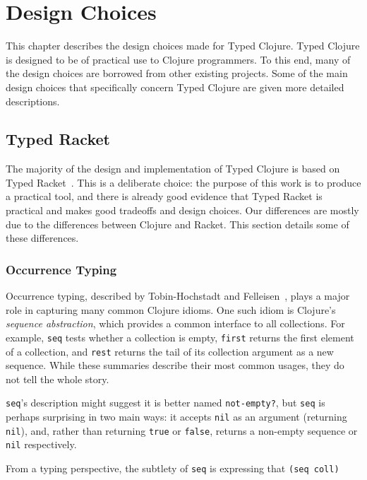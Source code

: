 \chapter{Design Choices}

This chapter describes the design choices made for Typed Clojure.
Typed Clojure is designed to be of practical use to Clojure programmers.
To this end, many of the design choices are borrowed from other existing projects.
Some of the main design choices that specifically concern Typed Clojure are given
more detailed descriptions.

\section{Typed Racket}

The majority of the design and implementation of Typed Clojure is based on Typed Racket~\cite{Tob10}.
This is a deliberate choice: the purpose of this work is to produce
a practical tool, and there is already good evidence that Typed Racket
is practical and makes good tradeoffs and design choices.
Our differences are mostly due to the differences between Clojure and Racket.
This section details some of these differences.

\subsection{Occurrence Typing}

Occurrence typing, described by Tobin-Hochstadt and Felleisen~\cite{TF10},
plays a major role in capturing many common Clojure idioms.
One such idiom is Clojure's \emph{sequence abstraction}, which
provides a common interface to all collections.
For example, \lstinline|seq| tests whether a collection is empty,
\lstinline|first| returns the first element of a collection,
and \lstinline|rest| returns the tail of its collection argument as a new sequence.
While these summaries describe their most common usages, they do not tell the whole story.

\lstinline|seq|'s description might suggest it is better named \lstinline|not-empty?|,
but \lstinline|seq| is perhaps surprising in two main ways: 
it accepts \lstinline|nil| as an argument (returning \lstinline|nil|),
and, rather than returning \lstinline|true| or \lstinline|false|, returns
a non-empty sequence or \lstinline|nil| respectively.

From a typing perspective, the subtlety of \lstinline|seq| is expressing that \lstinline|(seq coll)|

